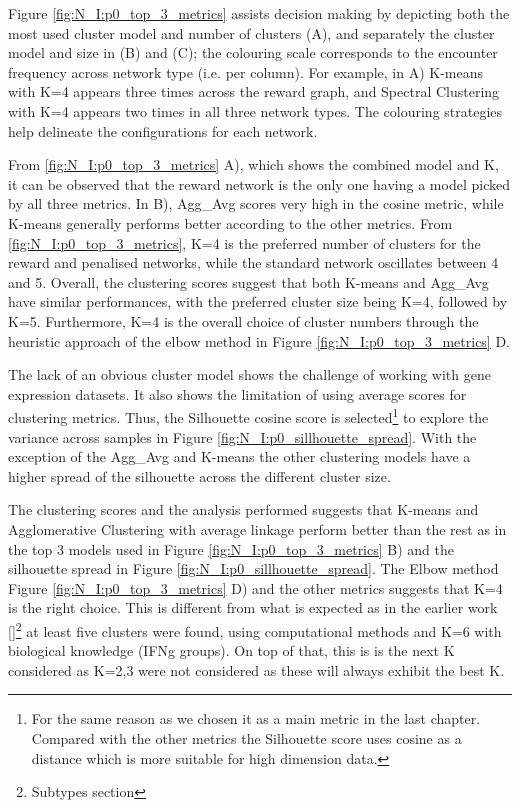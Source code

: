 Figure \ref{fig:N_I:p0_top_3_metrics} assists decision making by depicting both the most used cluster model and number of clusters (A), and separately the cluster model and size in (B) and (C); the colouring scale corresponds to the encounter frequency across network type (i.e. per column). For example, in A) K-means with K=4 appears three times across the reward graph, and Spectral Clustering with K=4 appears two times in all three network types. The colouring strategies help delineate the configurations for each network.

From \cref{fig:N_I:p0_top_3_metrics} A), which shows the combined model and K, it can be observed that the reward network is the only one having a model picked by all three metrics. In B), Agg\_Avg scores very high in the cosine metric, while K-means generally performs better according to the other metrics. From \cref{fig:N_I:p0_top_3_metrics}, K=4 is the preferred number of clusters for the reward and penalised networks, while the standard network oscillates between 4 and 5. Overall, the clustering scores suggest that both K-means and Agg\_Avg have similar performances, with the preferred cluster size being K=4, followed by K=5. Furthermore, K=4 is the overall choice of cluster numbers through the heuristic approach of the elbow method in Figure \ref{fig:N_I:p0_top_3_metrics} D.


The lack of an obvious cluster model shows the challenge of working with gene expression datasets. It also shows the limitation of using average scores for clustering metrics. Thus, the Silhouette cosine score is selected\footnote{For the same reason as we chosen it as a main metric in the last chapter. Compared with the other metrics the Silhouette score uses cosine as a distance which is more suitable for high dimension data.} to explore the variance across samples in Figure \ref{fig:N_I:p0_sillhouette_spread}. With the exception of the Agg\_Avg and K-means the other clustering models have a higher spread of the silhouette across the different cluster size.

The clustering scores and the analysis performed suggests that K-means and Agglomerative Clustering with average linkage perform better than the rest as in the top 3 models used in Figure \ref{fig:N_I:p0_top_3_metrics} B) and the silhouette spread in Figure \ref{fig:N_I:p0_sillhouette_spread}. The Elbow method Figure \ref{fig:N_I:p0_top_3_metrics} D) and the other metrics suggests that K=4 is the right choice. This is different from what is expected as in the earlier work \ref{}\footnote{Subtypes section} at least five clusters were found, using computational methods and K=6 with biological knowledge (IFNg groups). On top of that, this is is the next K considered as K=2,3 were not considered as these will always exhibit the best K.

